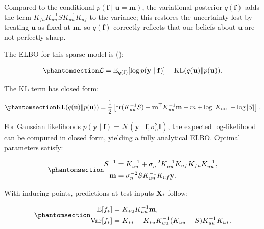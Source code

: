 \documentclass[
  letterpaper,
  DIV=11,
  numbers=noendperiod]{scrartcl}
\begin{document}
Compared to the conditional
\(p(\mathbf{f} \mid \mathbf{u} = \mathbf{m})\), the variational
posterior \(q(\mathbf{f})\) adds the term
\(K_{fu}K_{uu}^{-1}SK_{uu}^{-1}K_{uf}\) to the variance; this restores
the uncertainty lost by treating \(\mathbf{u}\) as fixed at
\(\mathbf{m}\), so \(q(\mathbf{f})\) correctly reflects that our beliefs
about \(\mathbf{u}\) are not perfectly sharp.

The ELBO for this sparse model is
():

\begin{equation}\phantomsection\label{eq-sparse_elbo}{
\mathcal{L} = \mathbb{E}_{q(\mathbf{f})}[\log p(\mathbf{y} \mid \mathbf{f})] - \operatorname{KL}(q(\mathbf{u}) \| p(\mathbf{u})).
}\end{equation}

The KL term has closed form:

\begin{equation}\phantomsection\label{eq-kl_inducing}{
\operatorname{KL}(q(\mathbf{u}) \| p(\mathbf{u})) = \frac{1}{2}\left[\operatorname{tr}(K_{uu}^{-1}S) + \mathbf{m}^\top K_{uu}^{-1} \mathbf{m} - m + \log|K_{uu}| - \log|S|\right].
}\end{equation}

For Gaussian likelihoods
\(p(\mathbf{y} \mid \mathbf{f}) = \mathcal{N}(\mathbf{y} \mid \mathbf{f}, \sigma_n^2 \mathbf{I})\),
the expected log-likelihood can be computed in closed form, yielding a
fully analytical ELBO. Optimal parameters satisfy:

\begin{equation}\phantomsection\label{eq-optimal_params}{
\begin{aligned}
S^{-1} &= K_{uu}^{-1} + \sigma_n^{-2} K_{uu}^{-1} K_{uf} K_{fu} K_{uu}^{-1}, \\
\mathbf{m} &= \sigma_n^{-2} S K_{uu}^{-1} K_{uf} \mathbf{y}.
\end{aligned}
}\end{equation}

With inducing points, predictions at test inputs \(\mathbf{X}_*\)
follow:

\begin{equation}\phantomsection\label{eq-sparse_predictions}{
\begin{aligned}
\mathbb{E}[f_*] &= K_{*u} K_{uu}^{-1} \mathbf{m}, \\
\text{Var}[f_*] &= K_{**} - K_{*u} K_{uu}^{-1} (K_{uu} - S) K_{uu}^{-1} K_{u*}.
\end{aligned}
}\end{equation}
\end{document}
